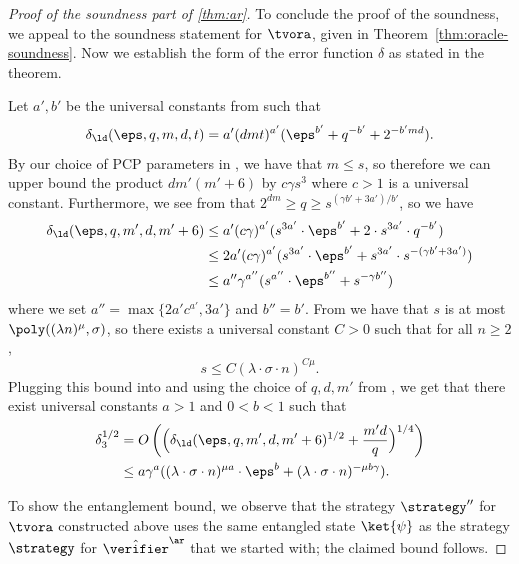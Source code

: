 \begin{proof}[Proof of the soundness part of \cref{thm:ar}]
	To conclude the proof of the soundness, we appeal to the soundness statement
  for $\tvora$, given in Theorem~\ref{thm:oracle-soundness}.
  Now we establish the form of the error function $\delta$ as stated in the
  theorem. 
  
  Let $a',b'$ be the universal constants from  such that
  \[
    \delta_\ld(\eps,q,m,d,t) = a' (dmt)^{a'} (\eps^{b'} + q^{-b'} + 2^{-b' m d}).
 	\]
	By our choice of PCP parameters in , we have that $m \leq
  s$, so therefore we can upper bound the product $dm'(m' + 6)$ by $c \gamma
  s^3$ where $c > 1$ is a universal constant.
  Furthermore, we see from  that $2^{dm} \geq q \geq s^{(\gamma
    b' + 3a')/b'}$, so we have
	\begin{align}
		\delta_\ld(\eps,q,m',d,m'+6)
    & \leq a' (c\gamma)^{a'} ( s^{3a'} \cdot \eps^{b'} +
      2 \cdot s^{3 a'} \cdot q^{-b'}) \notag \\
    & \leq 2 a' (c\gamma)^{a'} ( s^{3a'} \cdot \eps^{b'} + s^{3 a'}
      \cdot s^{-(\gamma b' + 3a')}) \notag \\
    & \leq a'' \gamma^{a''} ( s^{a''} \cdot \eps^{b''}
      + s^{-\gamma b''}) \label{eq:ar-sound-3}
	\end{align}
	where we set $a'' = \max \{ 2 a' c^{a'} , 3a'\}$ and $b'' = b'$.
From  we
  have that $s$ is at most $\poly( (\lambda n)^\mu , \sigma)$, so there exists a
  universal constant $C > 0$ such that for all $n \geq 2$,
  \[
  	s \leq C ( \lambda \cdot \sigma \cdot n)^{C \mu}.
  \]
  Plugging this bound into  and using the choice of $q,d,m'$
  from , we get that there exist universal constants $a > 1$
  and $0 < b < 1$ such that
  \begin{align*}
    \delta_3^{1/2}
    & = O \left ( \Big (\delta_\ld(\eps, q, m', d, m'+6)^{1/2} +
      \frac{m'd}{q} \Big)^{1/4} \right ) \\
    & \leq a \gamma^a ( (\lambda \cdot \sigma \cdot n)^{\mu a} \cdot \eps^{b}
      + (\lambda \cdot \sigma \cdot n)^{- \mu b \gamma}).
  \end{align*}  
  


  To show the entanglement bound, we observe that the strategy $\strategy''$ for
  $\tvora$ constructed above uses the same entangled state $\ket{\psi}$ as the
  strategy $\strategy$ for $\tvans$ that we started with; the claimed bound
  follows.
\end{proof}


 
 
